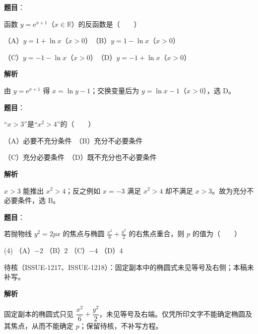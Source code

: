 \begin{answer}

\textbf{题目}：

函数 $y=\mathrm e^{x+1}$（$x\in\mathbb R$）的反函数是\mbox{（　　）}

（A）$y=1+\ln x$（$x>0$）　（B）$y=1-\ln x$（$x>0$）

（C）$y=-1-\ln x$（$x>0$）　（D）$y=-1+\ln x$（$x>0$）

\textbf{解析}

由 $y=\mathrm e^{x+1}$ 得 $x=\ln y-1$；交换变量后为 $y=\ln x-1$（$x>0$），选 D。


\end{answer}
\begin{answer}

\textbf{题目}：

“$x>3$”是“$x^2>4$”的\mbox{（　　）}

（A）必要不充分条件　（B）充分不必要条件

（C）充分必要条件　（D）既不充分也不必要条件

\textbf{解析}

$x>3$ 能推出 $x^2>4$；反之例如 $x=-3$ 满足 $x^2>4$ 却不满足 $x>3$。故为充分不必要条件，选 B。


\end{answer}
\begin{answer}

\textbf{题目}：

若抛物线 $y^2=2px$ 的焦点与椭圆 $\tfrac{x^2}{6}+\tfrac{y^2}{2}$ 的右焦点重合，则 $p$ 的值为\mbox{（　　）}

\begin{gkopts}(4)
\task （A）$-2$
\task （B）$2$
\task （C）$-4$
\task （D）$4$
\end{gkopts}

\begin{gktip}
待核（ISSUE-1217、ISSUE-1218）：固定副本中的椭圆式未见等号及右侧；本稿未补写。
\end{gktip}

\textbf{解析}

固定副本的椭圆式只见 $\dfrac{x^2}{6}+\dfrac{y^2}{2}$，未见等号及右端。仅凭所印文字不能确定椭圆及其焦点，从而不能确定 $p$；保留待核，不补写方程。


\end{answer}
